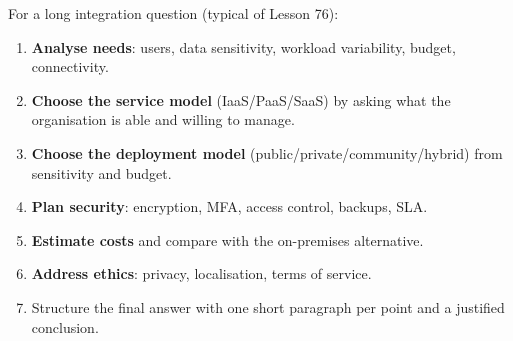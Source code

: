 \documentclass[11pt]{article}
\begin{document}
\begin{methode}
For a long integration question (typical of Lesson 76):
\begin{enumerate}
\item \textbf{Analyse needs}: users, data sensitivity, workload variability, budget, connectivity.
\item \textbf{Choose the service model} (IaaS/PaaS/SaaS) by asking what the organisation is able and willing to manage.
\item \textbf{Choose the deployment model} (public/private/community/hybrid) from sensitivity and budget.
\item \textbf{Plan security}: encryption, MFA, access control, backups, SLA.
\item \textbf{Estimate costs} and compare with the on-premises alternative.
\item \textbf{Address ethics}: privacy, localisation, terms of service.
\item Structure the final answer with one short paragraph per point and a justified conclusion.
\end{enumerate}
\end{methode}
\end{document}
